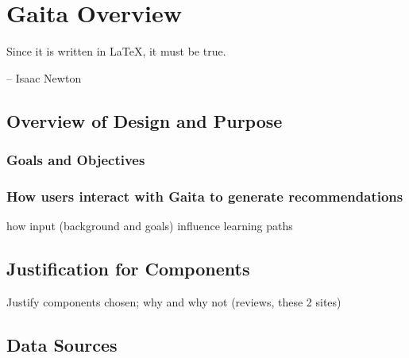 \chapter{Gaita Overview} \label{chap:chap-3}


\epigraph{Since it is written in \LaTeX, it must be true.}{-- Isaac Newton}





\section{Overview of Design and Purpose}

\subsection{Goals and Objectives}

\subsection{How users interact with Gaita to generate recommendations}

how input (background and goals) influence learning paths 

\section{Justification for Components} 
Justify components chosen; why and why not (reviews, these 2 sites) 


\section{Data Sources}